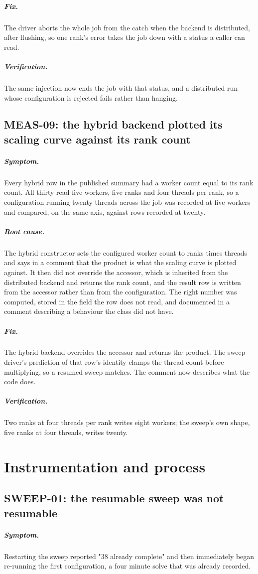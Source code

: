 \documentclass[11pt,a4paper]{report}
\newcommand{\symptom}[1]{\paragraph{Symptom.}#1}
\newcommand{\rootcause}[1]{\paragraph{Root cause.}#1}
\newcommand{\fix}[1]{\paragraph{Fix.}#1}
\newcommand{\verification}[1]{\paragraph{Verification.}#1}
\begin{document}
\fix{The driver aborts the whole job from the catch when the backend is
distributed, after flushing, so one rank's error takes the job down with a status
a caller can read.}

\verification{The same injection now ends the job with that status, and a
distributed run whose configuration is rejected fails rather than hanging.}

\section{MEAS-09: the hybrid backend plotted its scaling curve against its rank count}

\symptom{Every hybrid row in the published summary had a worker count equal to
its rank count. All thirty read five workers, five ranks and four threads per
rank, so a configuration running twenty threads across the job was recorded at
five workers and compared, on the same axis, against rows recorded at twenty.}

\rootcause{The hybrid constructor sets the configured worker count to ranks times
threads and says in a comment that the product is what the scaling curve is
plotted against. It then did not override the accessor, which is inherited from
the distributed backend and returns the rank count, and the result row is written
from the accessor rather than from the configuration. The right number was
computed, stored in the field the row does not read, and documented in a comment
describing a behaviour the class did not have.}

\fix{The hybrid backend overrides the accessor and returns the product. The
sweep driver's prediction of that row's identity clamps the thread count before
multiplying, so a resumed sweep matches. The comment now describes what the code
does.}

\verification{Two ranks at four threads per rank writes eight workers; the
sweep's own shape, five ranks at four threads, writes twenty.}

\chapter{Instrumentation and process}

\section{SWEEP-01: the resumable sweep was not resumable}

\symptom{Restarting the sweep reported "38 already complete" and then
immediately began re-running the first configuration, a four minute solve that
was already recorded.}
\end{document}
